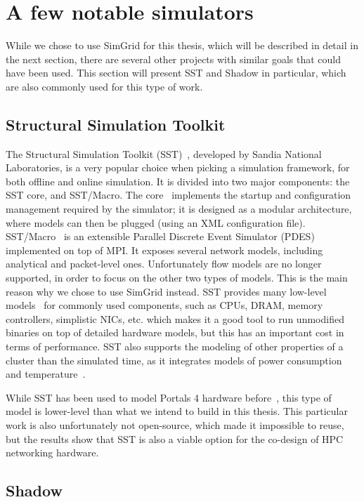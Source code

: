 \section{A few notable simulators}

While we chose to use SimGrid for this thesis, which will be described in detail
in the next section, there are several other projects with similar goals that
could have been used. This section will present SST and Shadow in particular,
which are also commonly used for this type of work.

\subsection{Structural Simulation Toolkit}

The Structural Simulation Toolkit (SST)~\cite{Hendry}, developed by Sandia
National Laboratories, is a very popular choice when picking a simulation
framework, for both offline and online simulation. It is divided into two major
components: the SST core, and SST/Macro. The core~\cite{Rodrigues2011}
implements the startup and configuration management required by the simulator;
it is designed as a modular architecture, where models can then be plugged
(using an XML configuration file). SST/Macro~\cite{Curtis2010} is an extensible
Parallel Discrete Event Simulator (PDES) implemented on top of MPI. It exposes
several network models, including analytical and packet-level ones.
Unfortunately flow models are no longer supported, in order to focus on the
other two types of models. This is the main reason why we chose to use SimGrid
instead. SST provides many low-level models~\cite{Murphy2004} for commonly used
components, such as CPUs, DRAM, memory controllers, simplistic NICs, etc. which
makes it a good tool to run unmodified binaries on top of detailed hardware
models, but this has an important cost in terms of performance. SST also
supports the modeling of other properties of a cluster than the simulated time,
as it integrates models of power consumption and
temperature~\cite{Hsieh2012}.

While SST has been used to model Portals 4 hardware
before~\cite{DiGirolamo2019}, this type of model is lower-level than what we
intend to build in this thesis. This particular work is also unfortunately not
open-source, which made it impossible to reuse, but the results show that SST is
also a viable option for the co-design of HPC networking hardware. 

\subsection{Shadow}

